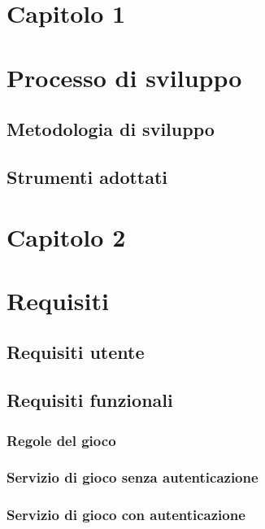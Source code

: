     \section*{\Huge {Capitolo 1}\label{chapter1}}
      \section{Processo di sviluppo}\label{sec:process}
        \subsection {Metodologia di sviluppo}\label{subsec:metodology}
        \subsection {Strumenti adottati}\label{subsec:tools}
        
        \clearpage
        
    \section*{\Huge {\textbf Capitolo 2}\label{chapter2}}
    \section{Requisiti}\label{sec:requirements}
         \subsection {Requisiti utente}\label{subsec:requirements:business}
             \subsection {Requisiti funzionali}\label{subsec:requirements:functional}
            \subsubsection[Gioco]{\large {Regole del gioco}\label{subsub:requirements:game}}
            \subsubsection[NoAutenticazion]{\large {Servizio di gioco senza autenticazione}\label{subsub:requirements:noauth}}
            \subsubsection[Autenticazion]{\large {Servizio di gioco con autenticazione}\label{subsub:requirements:auth}}
